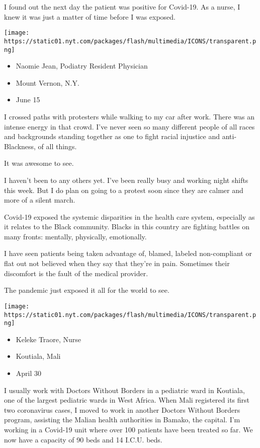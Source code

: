 I found out the next day the patient was positive for Covid-19. As a
nurse, I knew it was just a matter of time before I was exposed.

\texttt{[image: https://static01.nyt.com/packages/flash/multimedia/ICONS/transparent.png]}

\begin{itemize}
\tightlist
\item
  Naomie Jean, Podiatry Resident Physician
\item
  Mount Vernon, N.Y.
\item
  June 15
\end{itemize}

I crossed paths with protesters while walking to my car after work.
There was an intense energy in that crowd. I've never seen so many
different people of all races and backgrounds standing together as one
to fight racial injustice and anti-Blackness, of all things.

It was awesome to see.

I haven't been to any others yet. I've been really busy and working
night shifts this week. But I do plan on going to a protest soon since
they are calmer and more of a silent march.

Covid-19 exposed the systemic disparities in the health care system,
especially as it relates to the Black community. Blacks in this country
are fighting battles on many fronts: mentally, physically, emotionally.

I have seen patients being taken advantage of, blamed, labeled
non-compliant or flat out not believed when they say that they're in
pain. Sometimes their discomfort is the fault of the medical provider.

The pandemic just exposed it all for the world to see.

\texttt{[image: https://static01.nyt.com/packages/flash/multimedia/ICONS/transparent.png]}

\begin{itemize}
\tightlist
\item
  Keleke Traore, Nurse
\item
  Koutiala, Mali
\item
  April 30
\end{itemize}

I usually work with Doctors Without Borders in a pediatric ward in
Koutiala, one of the largest pediatric wards in West Africa. When Mali
registered its first two coronavirus cases, I moved to work in another
Doctors Without Borders program, assisting the Malian health authorities
in Bamako, the capital. I'm working in a Covid-19 unit where over 100
patients have been treated so far. We now have a capacity of 90 beds and
14 I.C.U. beds.

